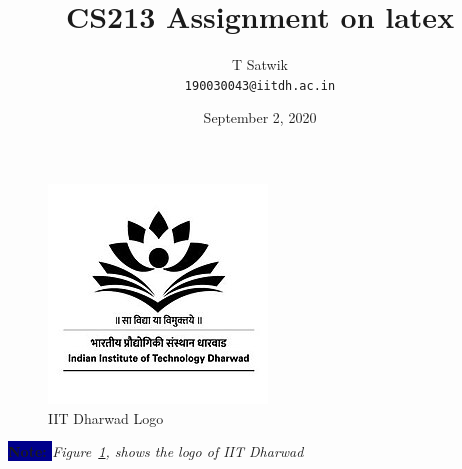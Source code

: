 \documentclass{article}
\begin{document}
 
\pagecolor{faintBlue}                                                   %
                                                                        
                                                                        
\title{CS213 Assignment on latex} 
\author{T Satwik \\ \texttt{190030043@iitdh.ac.in}}                     %
\date{September 2, 2020}

\tableofcontents                                                        %
\listoffigures
\listoftables
\begin{figure}                                                          %
    \centering
    \includegraphics{college-logo.jpg}
    \caption{IIT Dharwad Logo}
    \label{fig:college-logo}
\end{figure}
\maketitle
\begin{center}
\textbf{\colorbox{darkBlue}{\textcolor{faintBlue}{Note: }}} \textit{Figure~\ref{fig:college-logo}, shows the logo of IIT Dharwad}    
\end{center}
\end{document}
